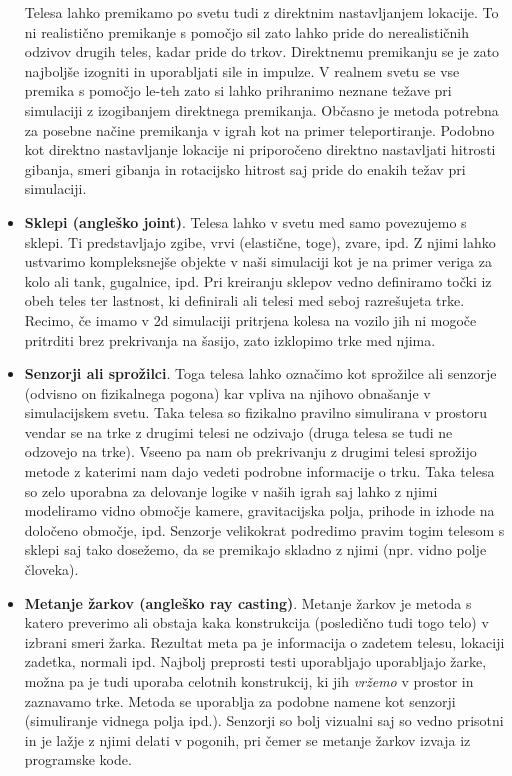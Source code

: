 \documentclass[12pt,a4paper,twoside]{book}
\begin{document}
\begin{itemize}
	Telesa lahko premikamo po svetu tudi z direktnim nastavljanjem lokacije. To ni realistično premikanje s pomočjo sil zato lahko pride do nerealističnih odzivov drugih teles, kadar pride do trkov. Direktnemu premikanju se je zato najboljše izogniti in uporabljati sile in impulze. V realnem svetu se vse premika s pomočjo le-teh zato si lahko prihranimo neznane težave pri simulaciji z izogibanjem direktnega premikanja. Občasno je metoda potrebna za posebne načine premikanja v igrah kot na primer teleportiranje. Podobno kot direktno nastavljanje lokacije ni priporočeno direktno nastavljati hitrosti gibanja, smeri gibanja in rotacijsko hitrost saj pride do enakih težav pri simulaciji.
	\item \textbf{Sklepi (angleško joint)}. Telesa lahko v svetu med samo povezujemo s sklepi. Ti predstavljajo zgibe, vrvi (elastične, toge), zvare, ipd. Z njimi lahko ustvarimo kompleksnejše objekte v naši simulaciji kot je na primer veriga za kolo ali tank, gugalnice, ipd.  Pri kreiranju sklepov vedno definiramo točki iz obeh teles ter lastnost, ki definirali ali telesi med seboj razrešujeta trke. Recimo, če imamo v 2d simulaciji pritrjena kolesa na vozilo jih ni mogoče pritrditi brez prekrivanja na šasijo, zato izklopimo trke med njima.
	\item \textbf{Senzorji ali sprožilci}. Toga telesa lahko označimo kot sprožilce ali senzorje (odvisno on fizikalnega pogona) kar vpliva na njihovo obnašanje v simulacijskem svetu. Taka telesa so fizikalno pravilno simulirana v prostoru vendar se na trke z drugimi telesi ne odzivajo (druga telesa se tudi ne odzovejo na trke). Vseeno pa nam ob prekrivanju z drugimi telesi sprožijo metode z katerimi nam dajo vedeti podrobne informacije o trku. Taka telesa so zelo uporabna za delovanje logike v naših igrah saj lahko z njimi modeliramo vidno območje kamere, gravitacijska polja, prihode in izhode na določeno območje, ipd. Senzorje velikokrat podredimo pravim togim telesom s sklepi saj tako dosežemo, da se premikajo skladno z njimi (npr. vidno polje človeka).
	\item \textbf{Metanje žarkov (angleško ray casting)}. Metanje žarkov je metoda s katero preverimo ali obstaja kaka konstrukcija (posledično tudi togo telo) v izbrani smeri žarka. Rezultat meta pa je informacija o zadetem telesu, lokaciji zadetka, normali ipd. Najbolj preprosti testi uporabljajo uporabljajo žarke, možna pa je tudi uporaba celotnih konstrukcij, ki jih \textit{vržemo} v prostor in zaznavamo trke. Metoda se uporablja za podobne namene kot senzorji (simuliranje vidnega polja ipd.). Senzorji so bolj vizualni saj so vedno prisotni in je lažje z njimi delati v pogonih, pri čemer se metanje žarkov izvaja iz programske kode.
\end{itemize}
\end{document}
